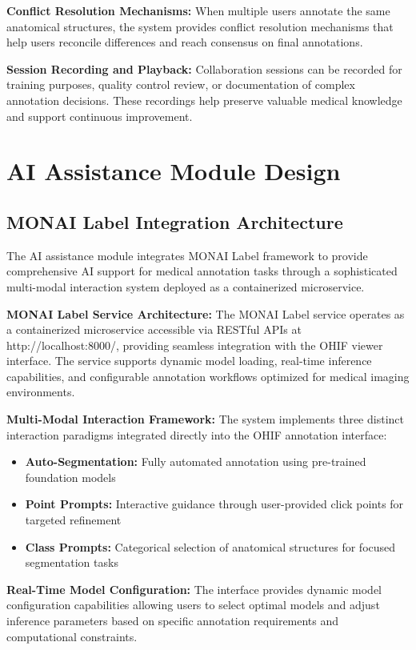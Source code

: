 \textbf{Conflict Resolution Mechanisms:} When multiple users annotate the same anatomical structures, the system provides conflict resolution mechanisms that help users reconcile differences and reach consensus on final annotations.

\textbf{Session Recording and Playback:} Collaboration sessions can be recorded for training purposes, quality control review, or documentation of complex annotation decisions. These recordings help preserve valuable medical knowledge and support continuous improvement.

\section{AI Assistance Module Design}

\subsection{MONAI Label Integration Architecture}

The AI assistance module integrates MONAI Label framework to provide comprehensive AI support for medical annotation tasks through a sophisticated multi-modal interaction system deployed as a containerized microservice.

\textbf{MONAI Label Service Architecture:} The MONAI Label service operates as a containerized microservice accessible via RESTful APIs at http://localhost:8000/, providing seamless integration with the OHIF viewer interface. The service supports dynamic model loading, real-time inference capabilities, and configurable annotation workflows optimized for medical imaging environments.

\textbf{Multi-Modal Interaction Framework:} The system implements three distinct interaction paradigms integrated directly into the OHIF annotation interface:

\begin{itemize}
    \item \textbf{Auto-Segmentation:} Fully automated annotation using pre-trained foundation models
    \item \textbf{Point Prompts:} Interactive guidance through user-provided click points for targeted refinement
    \item \textbf{Class Prompts:} Categorical selection of anatomical structures for focused segmentation tasks
\end{itemize}

\textbf{Real-Time Model Configuration:} The interface provides dynamic model configuration capabilities allowing users to select optimal models and adjust inference parameters based on specific annotation requirements and computational constraints.

